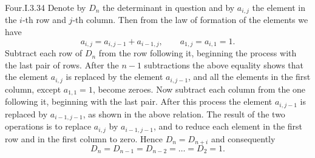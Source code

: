 \begin{ans}{Four.I.3.34}
      \answerasgiven
      Denote by \( D_n \) the determinant in question and by \( a_{i,j} \)
      the element in the \( i \)-th row and \( j \)-th column.
      Then from the law of formation of the elements we have
      \begin{equation*}
        a_{i,j}=a_{i,j-1}+a_{i-1,j},
        \qquad a_{1,j}=a_{i,1}=1.
      \end{equation*}
      Subtract each row of \( D_n \) from the row following it, beginning the
      process with the last pair of rows.
      After the \( n-1 \) subtractions the above equality shows that
      the element
      \( a_{i,j} \) is replaced by the element \( a_{i,j-1} \), and all the
      elements in the first column, except \( a_{1,1}=1 \), become zeroes.
      Now subtract each column from the one following it, beginning with the
      last pair.
      After this process the element \( a_{i,j-1} \) is replaced by
      \( a_{i-1,j-1} \), as shown in the above relation.
      The result of the two operations is to replace \( a_{i,j} \) by
      \( a_{i-1,j-1} \), and to reduce each element in the first row and in
      the first column to zero.
      Hence \( D_n=D_{n+i} \) and consequently
      \begin{equation*}
        D_n=D_{n-1}=D_{n-2}=\dots=D_2=1.
      \end{equation*}
    
\end{ans}
